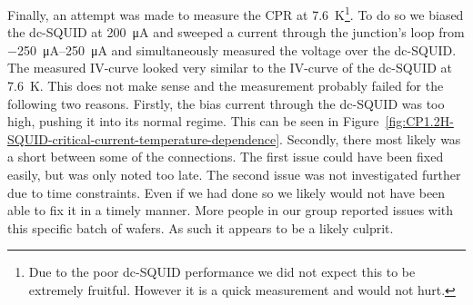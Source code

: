 Finally, an attempt was made to measure the CPR at \qty{7.6}{\kelvin}\footnote{Due to the poor dc-SQUID performance we did not expect this to be extremely fruitful. However it is a quick measurement and would not hurt.}. To do so we biased the dc-SQUID at \qty{200}{\micro\ampere} and sweeped a current through the junction's loop from \qtyrange{-250}{250}{\micro\ampere} and simultaneously measured the voltage over the dc-SQUID. The measured IV-curve looked very similar to the IV-curve of the dc-SQUID at \qty{7.6}{\kelvin}. This does not make sense and the measurement probably failed for the following two reasons. Firstly, the bias current through the dc-SQUID was too high, pushing it into its normal regime. This can be seen in Figure~\ref{fig:CP1.2H-SQUID-critical-current-temperature-dependence}. Secondly, there most likely was a short between some of the connections. The first issue could have been fixed easily, but was only noted too late. The second issue was not investigated further due to time constraints. Even if we had done so we likely would not have been able to fix it in a timely manner. More people in our group reported issues with this specific batch of  wafers. As such it appears to be a likely culprit.